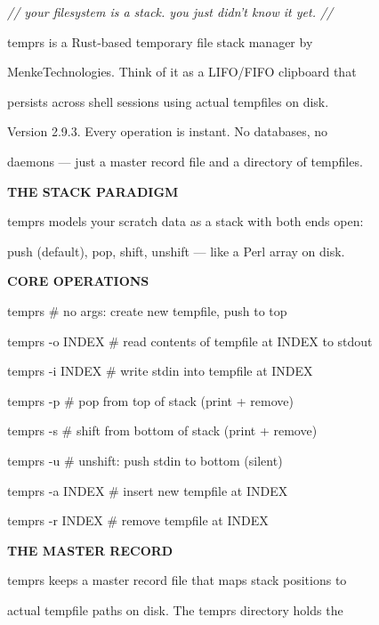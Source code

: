 \documentclass[11pt,a4paper,twoside]{book}
\begin{document}
{\small\itshape\color{dimtext} // your filesystem is a stack. you just didn't know it yet. //}

\begin{codebox}
temprs is a Rust-based temporary file stack manager by\\
\end{codebox}

MenkeTechnologies. Think of it as a LIFO/FIFO clipboard that

persists across shell sessions using actual tempfiles on disk.

Version 2.9.3. Every operation is instant. No databases, no

daemons — just a master record file and a directory of tempfiles.


\vspace{12pt}
{\bfseries\color{neonyellow} THE STACK PARADIGM}\vspace{4pt}

temprs models your scratch data as a stack with both ends open:

push (default), pop, shift, unshift — like a Perl array on disk.


\vspace{12pt}
{\bfseries\color{neonyellow} CORE OPERATIONS}\vspace{4pt}

temprs              \# no args: create new tempfile, push to top

temprs -o INDEX     \# read contents of tempfile at INDEX to stdout

temprs -i INDEX     \# write stdin into tempfile at INDEX

temprs -p           \# pop from top of stack (print + remove)

temprs -s           \# shift from bottom of stack (print + remove)

temprs -u           \# unshift: push stdin to bottom (silent)

temprs -a INDEX     \# insert new tempfile at INDEX

temprs -r INDEX     \# remove tempfile at INDEX


\vspace{12pt}
{\bfseries\color{neonyellow} THE MASTER RECORD}\vspace{4pt}

temprs keeps a master record file that maps stack positions to

actual tempfile paths on disk. The temprs directory holds the
\end{document}

